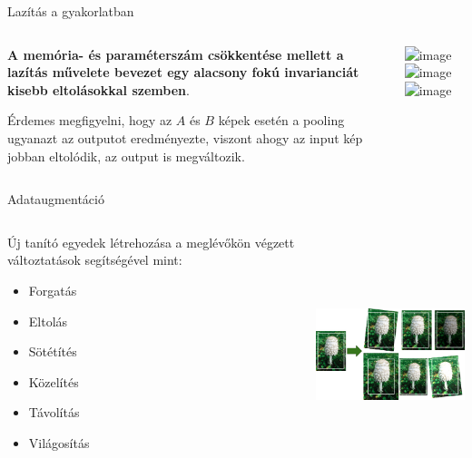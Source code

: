 \documentclass[english, aspectratio=169]{beamer}
\begin{document}
\begin{frame}{Lazítás a gyakorlatban}
\begin{columns}
\begin{column}{.5\textwidth}
\textbf{A memória- és paraméterszám csökkentése mellett a lazítás művelete bevezet egy alacsony fokú invarianciát kisebb eltolásokkal szemben}.\par\smallskip
Érdemes megfigyelni, hogy az $A$ és $B$ képek esetén a pooling ugyanazt az outputot eredményezte, viszont ahogy az input kép jobban eltolódik, az output is megváltozik.
\end{column}
\begin{column}{.5\textwidth}
\begin{center}
\includegraphics<1>[width=7cm, height=7cm, keepaspectratio]{images/neural_24.png}
\includegraphics<2>[width=7cm, height=7cm, keepaspectratio]{images/neural_25.png}
\includegraphics<3>[width=7cm, height=7cm, keepaspectratio]{images/neural_26.png}
\end{center}
\end{column}
\end{columns}
\end{frame}

\begin{frame}{Adataugmentáció}
\begin{columns}
\begin{column}{.5\textwidth}
Új tanító egyedek létrehozása a meglévőkön végzett változtatások segítségével mint:
\begin{itemize}
	\item Forgatás
	\item Eltolás
	\item Sötétítés
	\item Közelítés
	\item Távolítás
	\item Világosítás
\end{itemize}
\end{column}
\begin{column}{.5\textwidth}
\begin{center}
\includegraphics[width=7cm, height=7cm, keepaspectratio]{images/neural_27.png}
\end{center}
\end{column}
\end{columns}
\end{frame}
\end{document}
